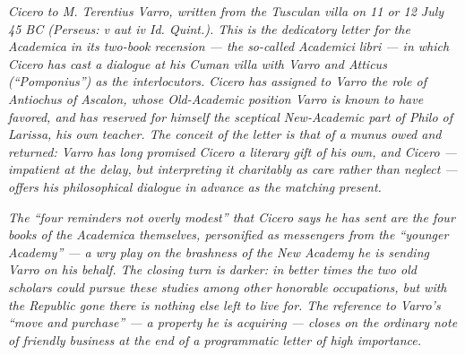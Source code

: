 
\textit{Cicero to M. Terentius Varro, written from the Tusculan villa
on 11 or 12 July 45 BC (Perseus: \textit{v aut iv Id. Quint.}). This
is the dedicatory letter for the \textit{Academica} in its
two-book recension --- the so-called \textit{Academici libri} --- in
which Cicero has cast a dialogue at his Cuman villa with Varro and
Atticus (``Pomponius'') as the interlocutors. Cicero has assigned to
Varro the role of Antiochus of Ascalon, whose Old-Academic position
Varro is known to have favored, and has reserved for himself the
sceptical New-Academic part of Philo of Larissa, his own teacher.
The conceit of the letter is that of a \textit{munus} owed and
returned: Varro has long promised Cicero a literary gift of his own,
and Cicero --- impatient at the delay, but interpreting it
charitably as care rather than neglect --- offers his philosophical
dialogue in advance as the matching present.}

\textit{The ``four reminders not overly modest'' that Cicero says
he has sent are the four books of the \textit{Academica} themselves,
personified as messengers from the ``younger Academy'' --- a wry
play on the brashness of the New Academy he is sending Varro on his
behalf. The closing turn is darker: in better times the two old
scholars could pursue these studies among other honorable
occupations, but with the Republic gone there is nothing else left
to live for. The reference to Varro's ``move and purchase'' --- a
property he is acquiring --- closes on the ordinary note of friendly
business at the end of a programmatic letter of high importance.}

